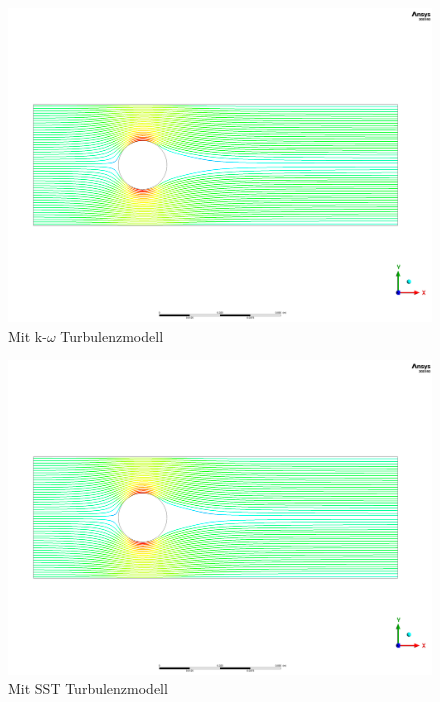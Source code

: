 \begin{refsection}
\begin{figure}
    \includegraphics[width=\textwidth]{papers/reynolds/images/k-w.png}
    \caption{Mit k-$\omega$ Turbulenzmodell}
    \label{fig:k-w}
\end{figure}

\begin{figure}
    \includegraphics[width=\textwidth]{papers/reynolds/images/sst.png}
    \caption{Mit SST Turbulenzmodell}
    \label{fig:SST}
\end{figure}


% 
% 
% 

\printbibliography[heading=subbibliography]
\end{refsection}
